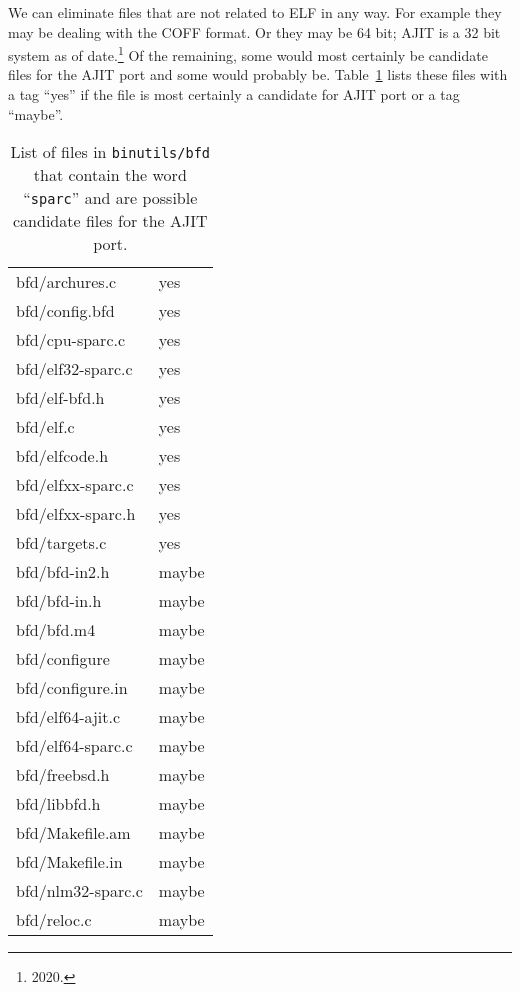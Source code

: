 We can  eliminate files that are not  related to ELF in  any way.  For
example they may  be dealing with the COFF format.  Or  they may be 64
bit;  AJIT is  a 32  bit system  as of  date.\footnote{2020.}   Of the
remaining, some would  most certainly be candidate files  for the AJIT
port  and some  would probably  be.  Table~\ref{tab:bfd:sparc:files:3}
lists these files  with a tag ``yes'' if the file  is most certainly a
candidate for AJIT port or a tag ``maybe''.
\begin{table}[ht]
  \centering
  \begin{tabular}[h]{|l|l|}
\hline
bfd/archures.c   & yes \\
bfd/config.bfd   & yes \\
bfd/cpu-sparc.c   & yes \\
bfd/elf32-sparc.c   & yes \\
bfd/elf-bfd.h   & yes \\
bfd/elf.c   & yes \\
bfd/elfcode.h   & yes \\
bfd/elfxx-sparc.c   & yes \\
bfd/elfxx-sparc.h   & yes \\
bfd/targets.c   & yes \\
\hline
bfd/bfd-in2.h   & maybe \\
bfd/bfd-in.h   & maybe \\
bfd/bfd.m4   & maybe \\
bfd/configure   & maybe \\
bfd/configure.in   & maybe \\
bfd/elf64-ajit.c   & maybe \\
bfd/elf64-sparc.c   & maybe \\
bfd/freebsd.h   & maybe \\
bfd/libbfd.h   & maybe \\
bfd/Makefile.am   & maybe \\
bfd/Makefile.in   & maybe \\
bfd/nlm32-sparc.c   & maybe \\
bfd/reloc.c   & maybe \\
\hline
\end{tabular}
\caption[List of files 3]{List of files in \texttt{binutils/bfd} that
  contain the word ``\texttt{sparc}'' and are possible candidate files
  for the AJIT port.} 
\label{tab:bfd:sparc:files:3}
\end{table}
